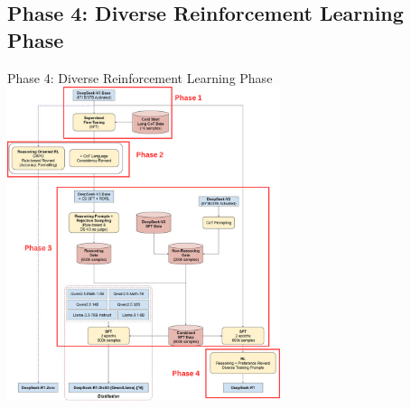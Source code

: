 \documentclass[8pt]{beamer}
\begin{document}
\subsection{Phase 4: Diverse Reinforcement Learning Phase}

\begin{frame}{Phase 4: Diverse Reinforcement Learning Phase}
\centering
\includegraphics[width=0.6\textwidth]{figures/phase4.png}
\end{frame}
\end{document}
